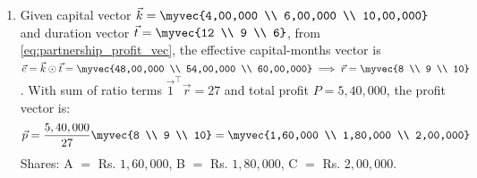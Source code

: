 \begin{enumerate}[label=\thesubsection.\arabic*, ref=\thesubsection.\theenumi]
\begin{enumerate}[label=\brak{\alph*}]
\begin{figure}[H]
		\end{figure}
		\item Given capital vector $\vec{k} = \myvec{4,00,000 \\ 6,00,000 \\ 10,00,000}$ and duration vector $\vec{t} = \myvec{12 \\ 9 \\ 6}$, from \eqref{eq:partnership_profit_vec}, the effective capital-months vector is $\vec{c} = \vec{k} \odot \vec{t} = \myvec{48,00,000 \\ 54,00,000 \\ 60,00,000} \implies \vec{r} = \myvec{8 \\ 9 \\ 10}$.
		With sum of ratio terms $\vec{1}^{\top}\vec{r} = 27$ and total profit $P = 5,40,000$, the profit vector is:
		\begin{align}
			\vec{p} = \frac{5,40,000}{27}\myvec{8 \\ 9 \\ 10} = \myvec{1,60,000 \\ 1,80,000 \\ 2,00,000}
		\end{align}
		Shares: A $=$ Rs. $1,60,000$, B $=$ Rs. $1,80,000$, C $=$ Rs. $2,00,000$.
		\begin{figure}[H]
			\centering
			\noindent{}
		\end{figure}
	\end{enumerate}
	

\end{enumerate}
